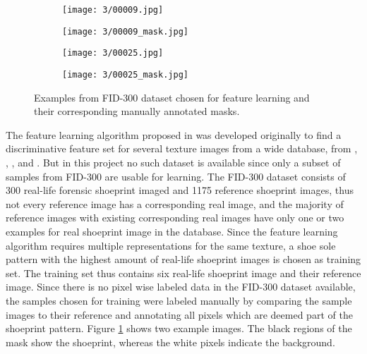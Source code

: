 \documentclass[draft,final]{vutinfth} %
\begin{document}
\begin{figure}[h]
  \centering
  \begin{subfigure}[t]{0.24\columnwidth}
    \centering
    \texttt{[image: 3/00009.jpg]}
  \end{subfigure}
  \begin{subfigure}[t]{0.24\columnwidth}
    \centering
    \texttt{[image: 3/00009\_mask.jpg]}
  \end{subfigure}
  \begin{subfigure}[t]{0.24\columnwidth}
    \centering
    \texttt{[image: 3/00025.jpg]}
  \end{subfigure}
  \begin{subfigure}[t]{0.24\columnwidth}
    \centering
    \texttt{[image: 3/00025\_mask.jpg]}
  \end{subfigure}
  \caption{Examples from FID-300 \cite{kortylewski2014unsupervised} dataset chosen for feature learning and their corresponding manually annotated masks.}
  \label{fig:pe:mask}
\end{figure}

\par
The feature learning algorithm proposed in \cite{guo2012discriminative} was developed originally to find a discriminative feature set for several texture images from a wide database, from \cite{ojala2002outex}, \cite{dana1999reflectance}, \cite{boland2001neural}, \cite{jantzen2005pap} and \cite{brahnam2007introduction}.
But in this project no such dataset is available since only a subset of samples from FID-300 are usable for learning. 
The FID-300 \cite{kortylewski2014unsupervised} dataset consists of 300 real-life forensic shoeprint imaged and 1175 reference shoeprint images, thus not every reference image has a corresponding real image, and the majority of reference images with existing corresponding real images have only one or two examples for real shoeprint image in the database.
Since the feature learning algorithm requires multiple representations for the same texture, a shoe sole pattern with the highest amount of real-life shoeprint images is chosen as training set.
The training set thus contains six real-life shoeprint image and their reference image. 
Since there is no pixel wise labeled data in the FID-300 dataset available, the samples chosen for training were labeled manually by comparing the sample images to their reference and annotating all pixels which are deemed part of the shoeprint pattern.
Figure \ref{fig:pe:mask} shows two example images. 
The black regions of the mask show the shoeprint, whereas the white pixels indicate the background.
\end{document}
